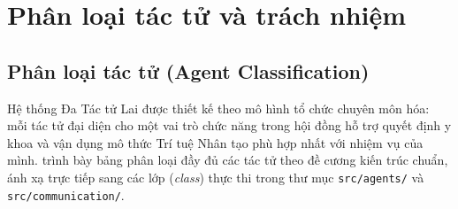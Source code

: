 \chapter{Phân loại tác tử và trách nhiệm}
\label{chap:agents}

\section{Phân loại tác tử (Agent Classification)}
\label{sec:agent-classification}

Hệ thống Đa Tác tử Lai được thiết kế theo mô hình tổ chức chuyên môn hóa: mỗi tác tử đại diện cho một vai trò chức năng trong hội đồng hỗ trợ quyết định y khoa và vận dụng mô thức Trí tuệ Nhân tạo phù hợp nhất với nhiệm vụ của mình.  trình bày bảng phân loại đầy đủ các tác tử theo đề cương kiến trúc chuẩn, ánh xạ trực tiếp sang các lớp (\emph{class}) thực thi trong thư mục \texttt{src/agents/} và \texttt{src/communication/}.

